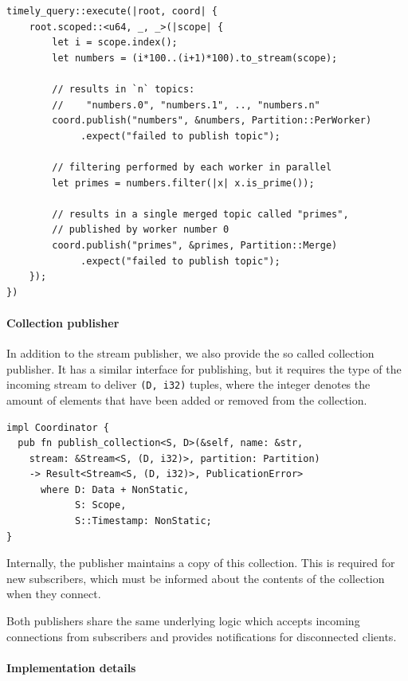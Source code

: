 \begin{lstlisting}[caption={
Example use of publisher.
}]
timely_query::execute(|root, coord| {
    root.scoped::<u64, _, _>(|scope| {
        let i = scope.index();
        let numbers = (i*100..(i+1)*100).to_stream(scope);

        // results in `n` topics:
        //    "numbers.0", "numbers.1", .., "numbers.n"
        coord.publish("numbers", &numbers, Partition::PerWorker)
             .expect("failed to publish topic");

        // filtering performed by each worker in parallel
        let primes = numbers.filter(|x| x.is_prime());

        // results in a single merged topic called "primes",
        // published by worker number 0
        coord.publish("primes", &primes, Partition::Merge)
             .expect("failed to publish topic");
    });
})
\end{lstlisting}


\paragraph{Collection publisher}

In addition to the stream publisher, we also provide the so called collection
publisher. It has a similar interface for publishing, but it requires the
type of the incoming stream to deliver \lstinline{(D, i32)} tuples, where
the integer denotes the amount of elements that have been added or removed from
the collection.

\begin{lstlisting}[caption={[Collection publisher interface]
}]
impl Coordinator {
  pub fn publish_collection<S, D>(&self, name: &str,
    stream: &Stream<S, (D, i32)>, partition: Partition)
    -> Result<Stream<S, (D, i32)>, PublicationError>
      where D: Data + NonStatic, 
            S: Scope,
            S::Timestamp: NonStatic;
}
\end{lstlisting}

Internally, the publisher maintains a copy of this collection. This is required
for new subscribers, which must be informed about the contents of the collection
when they connect.

Both publishers share the same underlying logic which accepts incoming connections
from subscribers and provides notifications for disconnected clients.



\paragraph{Implementation details}


